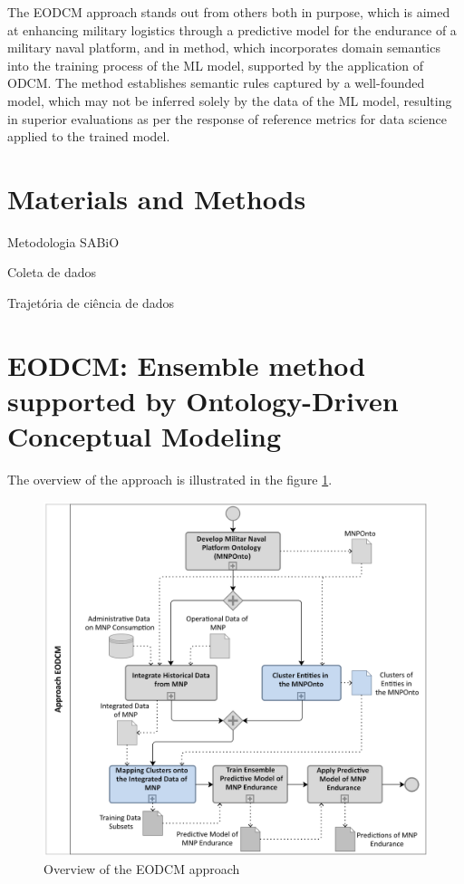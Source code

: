 \documentclass[
]{ceurart}
\begin{document}
\par The EODCM approach stands out from others both in purpose, which is aimed at enhancing military logistics through a predictive model for the endurance of a military naval platform, and in method, which incorporates domain semantics into the training process of the ML model, supported by the application of ODCM. The method establishes semantic rules captured by a well-founded model, which may not be inferred solely by the data of the ML model, resulting in superior evaluations as per the response of reference metrics for data science applied to the trained model.


\section{Materials and Methods}

Metodologia SABiO

Coleta de dados

Trajetória de ciência de dados


\section{EODCM: Ensemble method supported by Ontology-Driven Conceptual Modeling}

The overview of the approach is illustrated in the figure \ref{fig:approach}.

\begin{figure}[ht]
    \centering
    \includegraphics[width=\linewidth]{images/visao-geral-en.png}
    \caption{Overview of the EODCM approach}
    \label{fig:approach}
\end{figure}
\end{document}
